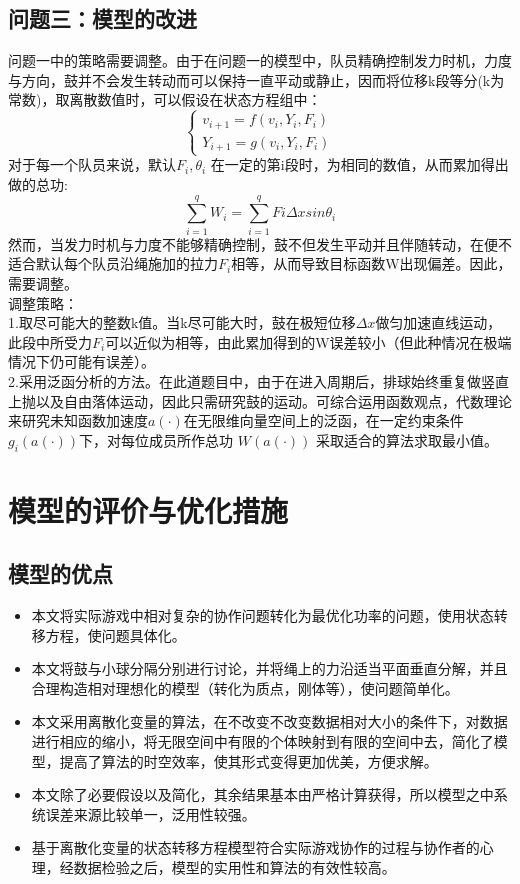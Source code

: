 \documentclass[withoutpreface,bwprint]{cumcmthesis}
\begin{document}
\subsection{问题三：模型的改进}
问题一中的策略需要调整。由于在问题一的模型中，队员精确控制发力时机，力度与方向，鼓并不会发生转动而可以保持一直平动或静止，因而将位移k段等分(k为常数)，取离散数值时，可以假设在状态方程组中：
\begin{equation*}
	\begin{cases}
		v_{i+1} = f\left(v_i, Y_i, F_i\right)\\
		Y_{i+1} = g\left(v_i, Y_i, F_i\right)
	\end{cases}
\end{equation*}
对于每一个队员来说，默认$F_i, \theta_i$ 在一定的第i段时，为相同的数值，从而累加得出做的总功:
\[\sum_{i = 1}^qW_i = \sum_{i = 1}^qFi\Delta x sin\theta_i\]
然而，当发力时机与力度不能够精确控制，鼓不但发生平动并且伴随转动，在便不适合默认每个队员沿绳施加的拉力$F_i$相等，从而导致目标函数W出现偏差。因此，需要调整。\\
调整策略：\\
1.取尽可能大的整数k值。当k尽可能大时，鼓在极短位移$\Delta{x}$做匀加速直线运动，此段中所受力$F_i$可以近似为相等，由此累加得到的W误差较小（但此种情况在极端情况下仍可能有误差）。\\
2.采用泛函分析的方法。在此道题目中，由于在进入周期后，排球始终重复做竖直上抛以及自由落体运动，因此只需研究鼓的运动。可综合运用函数观点，代数理论来研究未知函数加速度$a(·)$在无限维向量空间上的泛函，在一定约束条件$g_i(a(·))$下，对每位成员所作总功 $W (a(·))$ 采取适合的算法求取最小值。

\section{模型的评价与优化措施}
\subsection{模型的优点}
\begin{itemize}
	\item 本文将实际游戏中相对复杂的协作问题转化为最优化功率的问题，使用状态转移方程，使问题具体化。
	\item 本文将鼓与小球分隔分别进行讨论，并将绳上的力沿适当平面垂直分解，并且合理构造相对理想化的模型（转化为质点，刚体等），使问题简单化。
	\item 本文采用离散化变量的算法，在不改变不改变数据相对大小的条件下，对数据进行相应的缩小，将无限空间中有限的个体映射到有限的空间中去，简化了模型，提高了算法的时空效率，使其形式变得更加优美，方便求解。
	\item 本文除了必要假设以及简化，其余结果基本由严格计算获得，所以模型之中系统误差来源比较单一，泛用性较强。
	\item 基于离散化变量的状态转移方程模型符合实际游戏协作的过程与协作者的心理，经数据检验之后，模型的实用性和算法的有效性较高。
\end{itemize}
\end{document}
